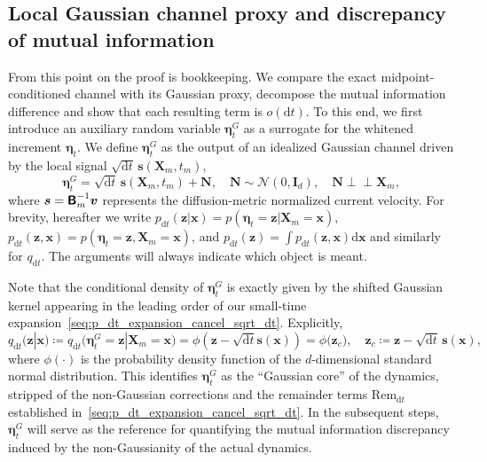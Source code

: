 \subsection{Local Gaussian channel proxy and discrepancy of mutual information}
\vspace*{-0.6\baselineskip}
From this point on the proof is bookkeeping. We compare the exact midpoint-conditioned channel with its Gaussian proxy, decompose the mutual information difference and show that each resulting term is $o(\mathrm dt)$.
To this end, we first introduce an auxiliary random variable $\bm\eta_t^G$ as a surrogate for the whitened increment $\bm\eta_t$.
We define $\bm\eta_t^G$ as the output of an idealized Gaussian channel driven by the local signal $\sqrt{\mathrm dt}\,\bm s(\bm X_m,t_m)$,
\begin{equation}
    \bm\eta_t^G=\sqrt{\mathrm dt}\,\bm s(\bm X_m,t_m)+\bm N,
    \quad
    \bm N\sim\mathcal N(0,\mathbf I_d),
    \quad\bm N\perp\!\!\!\perp\bm X_m,
    \label{seq:Gaussian_channel_proxy}
\end{equation}
where $\bm s=\boldsymbol{\mathsf{B}}_m^{-1}\bm v$ represents the diffusion-metric normalized current velocity.
For brevity, hereafter we write $p_{\mathrm dt}(\bm z|\bm x)=p(\bm\eta_t=\bm z|\bm X_m=\bm x)$, $p_{\mathrm dt}(\bm z,\bm x)=p(\bm\eta_t=\bm z,\bm X_m=\bm x)$, and $p_{\mathrm dt}(\bm z)=\int p_{\mathrm dt}(\bm z,\bm x)\mathrm d\bm x$ and similarly for $q_{\mathrm dt}$. The arguments will always indicate which object is meant.

Note that the conditional density of $\bm\eta_t^G$ is exactly given by the shifted Gaussian kernel appearing in the leading order of our small-time expansion~\eqref{seq:p_dt_expansion_cancel_sqrt_dt}. Explicitly,
\begin{equation}
    q_{\mathrm dt}(\bm z|\bm x)\coloneq
    q_{\mathrm dt}\big(\bm\eta_t^G=\bm z|\bm X_m=\bm x\big) 
    = \phi\!\left(\bm z - \sqrt{\mathrm dt}\bm s(\bm x)\right) 
    = \phi\big(\bm z_c\big),
    \quad
    \bm z_c\coloneq\bm z-\sqrt{\mathrm dt}\,\bm s(\bm x),
    \label{seq:q_dt_equal_phi}
\end{equation}
where $\phi(\cdot)$ is the probability density function of the $d$-dimensional standard normal distribution. This identifies $\bm\eta_t^G$ as the ``Gaussian core'' of the dynamics, stripped of the non-Gaussian corrections and the remainder terms $\mathrm{Rem}_{\mathrm dt}$ established in~\eqref{seq:p_dt_expansion_cancel_sqrt_dt}. In the subsequent steps, $\bm\eta_t^G$ will serve as the reference for quantifying the mutual information discrepancy induced by the non-Gaussianity of the actual dynamics.

